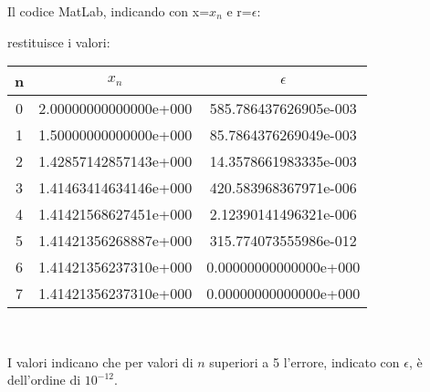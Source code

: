 Il codice MatLab, indicando con x=$x_n$ e r=$\epsilon$:

\newpage
restituisce i valori:
\begin{center}
\begin{tabular}{c|c|c}
n & $x_n$ & $\epsilon$ \\
\hline
    0 & 2.00000000000000e+000 & 585.786437626905e-003\\
    1 & 1.50000000000000e+000 & 85.7864376269049e-003\\
    2 & 1.42857142857143e+000 & 14.3578661983335e-003\\
    3 & 1.41463414634146e+000 & 420.583968367971e-006\\
    4 & 1.41421568627451e+000 & 2.12390141496321e-006\\
    5 & 1.41421356268887e+000 & 315.774073555986e-012\\
    6 & 1.41421356237310e+000 & 0.00000000000000e+000\\
    7 & 1.41421356237310e+000 & 0.00000000000000e+000\\
\end{tabular} \\
\end{center}

I valori indicano che per valori di $n$ superiori a 5 l'errore, indicato con $\epsilon$, è dell'ordine di \(10^{-12}\).
